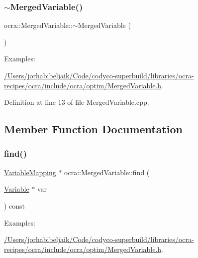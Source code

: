\subsubsection{\texorpdfstring{$\sim$\+Merged\+Variable()}{~MergedVariable()}}
{\footnotesize\ttfamily ocra\+::\+Merged\+Variable\+::$\sim$\+Merged\+Variable (\begin{DoxyParamCaption}{ }\end{DoxyParamCaption})}

\begin{Desc}
\item[Examples\+: ]\par
\hyperlink{_2Users_2jorhabibeljaik_2Code_2codyco-superbuild_2libraries_2ocra-recipes_2ocra_2include_2ocra_27dfe52ed2d2fe1904154f5be9150e8b1}{/\+Users/jorhabibeljaik/\+Code/codyco-\/superbuild/libraries/ocra-\/recipes/ocra/include/ocra/optim/\+Merged\+Variable.\+h}.\end{Desc}


Definition at line 13 of file Merged\+Variable.\+cpp.



\subsection{Member Function Documentation}
\hypertarget{classocra_1_1MergedVariable_a54dea5dde63addca4de73ea8fdb6073b}{}\label{classocra_1_1MergedVariable_a54dea5dde63addca4de73ea8fdb6073b} 
\subsubsection{\texorpdfstring{find()}{find()}}
{\footnotesize\ttfamily \hyperlink{classocra_1_1VariableMapping}{Variable\+Mapping} $\ast$ ocra\+::\+Merged\+Variable\+::find (\begin{DoxyParamCaption}\item[{\hyperlink{classocra_1_1Variable}{Variable} $\ast$}]{var }\end{DoxyParamCaption}) const}

\begin{Desc}
\item[Examples\+: ]\par
\hyperlink{_2Users_2jorhabibeljaik_2Code_2codyco-superbuild_2libraries_2ocra-recipes_2ocra_2include_2ocra_27dfe52ed2d2fe1904154f5be9150e8b1}{/\+Users/jorhabibeljaik/\+Code/codyco-\/superbuild/libraries/ocra-\/recipes/ocra/include/ocra/optim/\+Merged\+Variable.\+h}.\end{Desc}



